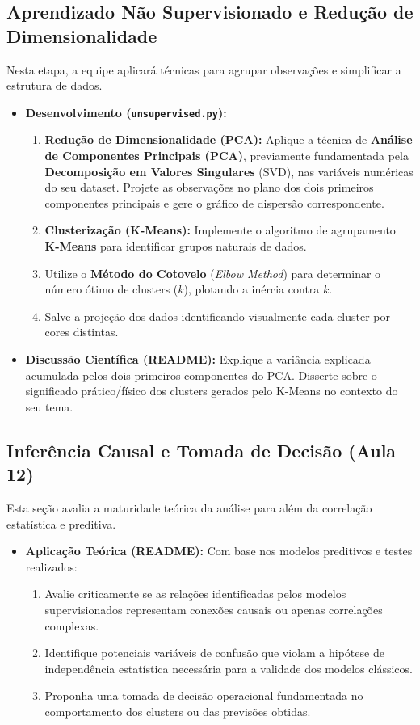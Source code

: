 \documentclass[12pt,a4paper]{article}
\begin{document}
	\subsection{Aprendizado Não Supervisionado e Redução de Dimensionalidade}
	Nesta etapa, a equipe aplicará técnicas para agrupar observações e simplificar a estrutura de dados.
	\begin{itemize}
		\item \textbf{Desenvolvimento (\texttt{unsupervised.py}):}
		\begin{enumerate}
			\item \textbf{Redução de Dimensionalidade (PCA):} Aplique a técnica de \textbf{Análise de Componentes Principais (PCA)}, previamente fundamentada pela \textbf{Decomposição em Valores Singulares} (SVD), nas variáveis numéricas do seu dataset. Projete as observações no plano dos dois primeiros componentes principais e gere o gráfico de dispersão correspondente.
			\item \textbf{Clusterização (K-Means):} Implemente o algoritmo de agrupamento \textbf{K-Means} para identificar grupos naturais de dados.
			\item Utilize o \textbf{Método do Cotovelo} (\textit{Elbow Method}) para determinar o número ótimo de clusters ($k$), plotando a inércia contra $k$.
			\item Salve a projeção dos dados identificando visualmente cada cluster por cores distintas.
		\end{enumerate}
		\item \textbf{Discussão Científica (README):} Explique a variância explicada acumulada pelos dois primeiros componentes do PCA. Disserte sobre o significado prático/físico dos clusters gerados pelo K-Means no contexto do seu tema.
	\end{itemize}

	\subsection{Inferência Causal e Tomada de Decisão (Aula 12)}
	Esta seção avalia a maturidade teórica da análise para além da correlação estatística e preditiva.
	\begin{itemize}
		\item \textbf{Aplicação Teórica (README):} Com base nos modelos preditivos e testes realizados:
		\begin{enumerate}[label=\alph*)]
			\item Avalie criticamente se as relações identificadas pelos modelos supervisionados representam conexões causais ou apenas correlações complexas.
			\item Identifique potenciais variáveis de confusão que violam a hipótese de independência estatística necessária para a validade dos modelos clássicos.
			\item Proponha uma tomada de decisão operacional fundamentada no comportamento dos clusters ou das previsões obtidas.
		\end{enumerate}
	\end{itemize}
	
\end{document}

